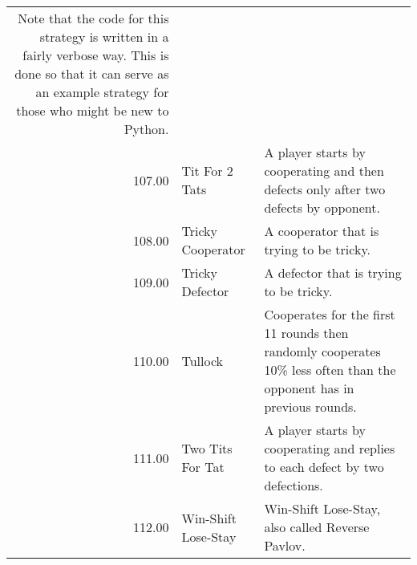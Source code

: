 \begin{tabular}{rll}
	Note that the code for this strategy is written in a fairly verbose
	way. This is done so that it can serve as an example strategy for
	those who might be new to Python.                                                                                                                                                                                                                                                                                                                                                                                                                                                                                                                                                                                                                                                                                                                                             \\
	107.00 & Tit For 2 Tats              & A player starts by cooperating and then defects only after two defects by opponent.                                               \\
	108.00 & Tricky Cooperator           & A cooperator that is trying to be tricky.                                                                                         \\
	109.00 & Tricky Defector             & A defector that is trying to be tricky.                                                                                           \\
	110.00 & Tullock                     & Cooperates for the first 11 rounds then randomly cooperates 10\% less often
	than the opponent has in previous rounds.                                                                                                                                                                                                                                                                                                                                                                                                                                                                                                                                                                                                                                                                                                                                                                                                                                                                                                 \\
	111.00 & Two Tits For Tat            & A player starts by cooperating and replies to each defect by two defections.                                                      \\
	112.00 & Win-Shift Lose-Stay         & Win-Shift Lose-Stay, also called Reverse Pavlov.


\end{tabular}
